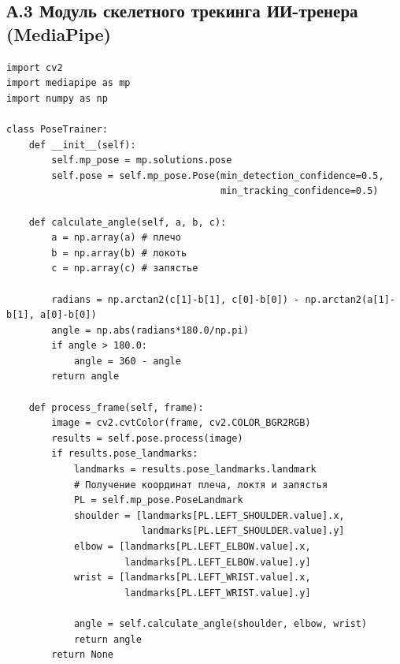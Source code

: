 \documentclass[utf8, russian]{eskdtext}
\begin{document}
\subsection*{А.3 Модуль скелетного трекинга ИИ-тренера (MediaPipe)}
\begin{verbatim}
import cv2
import mediapipe as mp
import numpy as np

class PoseTrainer:
    def __init__(self):
        self.mp_pose = mp.solutions.pose
        self.pose = self.mp_pose.Pose(min_detection_confidence=0.5,
                                      min_tracking_confidence=0.5)
        
    def calculate_angle(self, a, b, c):
        a = np.array(a) # плечо
        b = np.array(b) # локоть
        c = np.array(c) # запястье
        
        radians = np.arctan2(c[1]-b[1], c[0]-b[0]) - np.arctan2(a[1]-b[1], a[0]-b[0])
        angle = np.abs(radians*180.0/np.pi)
        if angle > 180.0:
            angle = 360 - angle
        return angle

    def process_frame(self, frame):
        image = cv2.cvtColor(frame, cv2.COLOR_BGR2RGB)
        results = self.pose.process(image)
        if results.pose_landmarks:
            landmarks = results.pose_landmarks.landmark
            # Получение координат плеча, локтя и запястья
            PL = self.mp_pose.PoseLandmark
            shoulder = [landmarks[PL.LEFT_SHOULDER.value].x,
                        landmarks[PL.LEFT_SHOULDER.value].y]
            elbow = [landmarks[PL.LEFT_ELBOW.value].x,
                     landmarks[PL.LEFT_ELBOW.value].y]
            wrist = [landmarks[PL.LEFT_WRIST.value].x,
                     landmarks[PL.LEFT_WRIST.value].y]
            
            angle = self.calculate_angle(shoulder, elbow, wrist)
            return angle
        return None
\end{verbatim}
\end{document}
